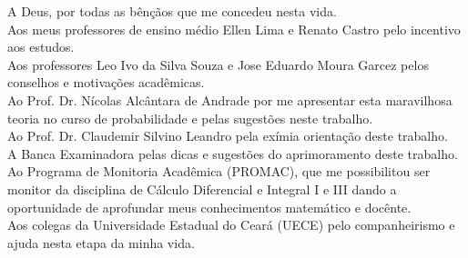 A Deus, por todas as bênçãos que me concedeu nesta vida.\\
Aos meus professores de ensino médio Ellen Lima e Renato Castro pelo incentivo aos estudos.\\
Aos professores Leo Ivo da Silva Souza e Jose Eduardo Moura Garcez pelos conselhos e motivações acadêmicas.\\
Ao Prof. Dr. Nícolas Alcântara de Andrade por me apresentar esta maravilhosa teoria no curso de probabilidade e pelas sugestões neste trabalho. \\
Ao Prof. Dr. Claudemir Silvino Leandro pela exímia orientação deste trabalho.\\
A Banca Examinadora pelas dicas e sugestões do aprimoramento deste trabalho.\\
Ao Programa de Monitoria Acadêmica (PROMAC), que me possibilitou ser monitor da disciplina de Cálculo Diferencial e Integral I e III dando a oportunidade de aprofundar meus conhecimentos matemático e docênte.\\
Aos colegas da Universidade Estadual do Ceará (UECE) pelo companheirismo e ajuda nesta etapa da minha vida.\\




